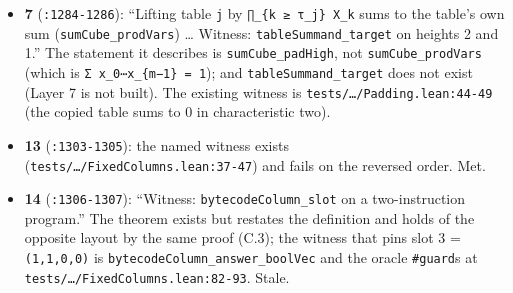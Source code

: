 \begin{itemize}
\item \textbf{7} (\texttt{:1284-{}1286}): \enquote{Lifting table \texttt{j} by \texttt{∏\_\allowbreak{}\{k ≥ τ\_\allowbreak{}j\} X\_\allowbreak{}k} sums to the table's own sum (\texttt{sumCube\_\allowbreak{}prodVars}) … Witness: \texttt{tableSummand\_\allowbreak{}target} on heights 2 and 1.} The statement it describes is \texttt{sumCube\_\allowbreak{}padHigh}, not \texttt{sumCube\_\allowbreak{}prodVars} (which is \texttt{Σ x\_\allowbreak{}0⋯x\_\allowbreak{}\{m−1\} = 1}); and \texttt{tableSummand\_\allowbreak{}target} does not exist (Layer 7 is not built). The existing witness is \texttt{tests/\allowbreak{}…/\allowbreak{}Padding.\allowbreak{}lean:44-{}49} (the copied table sums to 0 in characteristic two).
\item \textbf{13} (\texttt{:1303-{}1305}): the named witness exists (\texttt{t\allowbreak{}e\allowbreak{}s\allowbreak{}t\allowbreak{}s\allowbreak{}/\allowbreak{}…\allowbreak{}/\allowbreak{}F\allowbreak{}i\allowbreak{}x\allowbreak{}e\allowbreak{}d\allowbreak{}C\allowbreak{}o\allowbreak{}l\allowbreak{}u\allowbreak{}m\allowbreak{}n\allowbreak{}s\allowbreak{}.\allowbreak{}l\allowbreak{}e\allowbreak{}a\allowbreak{}n\allowbreak{}:\allowbreak{}3\allowbreak{}7\allowbreak{}-{}\allowbreak{}4\allowbreak{}7}) and fails on the reversed order. Met.
\item \textbf{14} (\texttt{:1306-{}1307}): \enquote{Witness: \texttt{bytecodeColumn\_\allowbreak{}slot} on a two-instruction program.} The theorem exists but restates the definition and holds of the opposite layout by the same proof (C.3); the witness that pins slot 3 = \texttt{(\allowbreak{}1,\allowbreak{}1,\allowbreak{}0,\allowbreak{}0)} is \texttt{b\allowbreak{}y\allowbreak{}t\allowbreak{}e\allowbreak{}c\allowbreak{}o\allowbreak{}d\allowbreak{}e\allowbreak{}C\allowbreak{}o\allowbreak{}l\allowbreak{}u\allowbreak{}m\allowbreak{}n\allowbreak{}\_\allowbreak{}a\allowbreak{}n\allowbreak{}s\allowbreak{}w\allowbreak{}e\allowbreak{}r\allowbreak{}\_\allowbreak{}b\allowbreak{}o\allowbreak{}o\allowbreak{}l\allowbreak{}V\allowbreak{}e\allowbreak{}c} and the oracle \texttt{\#guard}s at \texttt{t\allowbreak{}e\allowbreak{}s\allowbreak{}t\allowbreak{}s\allowbreak{}/\allowbreak{}…\allowbreak{}/\allowbreak{}F\allowbreak{}i\allowbreak{}x\allowbreak{}e\allowbreak{}d\allowbreak{}C\allowbreak{}o\allowbreak{}l\allowbreak{}u\allowbreak{}m\allowbreak{}n\allowbreak{}s\allowbreak{}.\allowbreak{}l\allowbreak{}e\allowbreak{}a\allowbreak{}n\allowbreak{}:\allowbreak{}8\allowbreak{}2\allowbreak{}-{}\allowbreak{}9\allowbreak{}3}. Stale.

\end{itemize}
